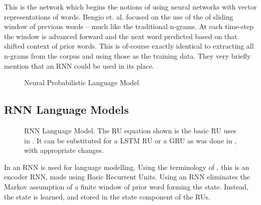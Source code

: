 \documentclass[parskip]{komatufte}
\begin{document}
This is the network which begins the notions of using neural networks with vector representations of words.
Bengio et. al. focused on the use of the of sliding window of previous words -- much like the traditional n-grams.
At each time-step the window is advanced forward and the next word predicted based on that shifted context of prior words.
This is of-course exactly identical to extracting all n-grams from the corpus and using those as the training data.
They very briefly mention that an RNN could be used in its place.

\begin{figure}
	\caption{\label{fig:neural-language-model} Neural Probabilistic Language Model}
	\centering
	 
\end{figure}


\subsection{RNN Language Models}
\begin{figure}
	\caption{\label{fig:neural-language-model} RNN Language Model. The RU equation shown is the basic RU uses in \textcite{mikolov2010recurrent}.
	It can be substituted for a LSTM RU or a GRU as was done in \textcite{sundermeyer2012lstm,jozefowicz2015empirical}, with appropriate changes.
	}
	\centering
	\resizebox{\textwidth}{!}{}
\end{figure}


In  an RNN is used for language modelling.
Using the terminology of , this is an encoder RNN, made using Basic Recurrent Units.
Using an RNN eliminates the Markov assumption of a finite window of prior word forming the state.
Instead, the state is learned, and stored in the state component of the RUs. 
\end{document}
